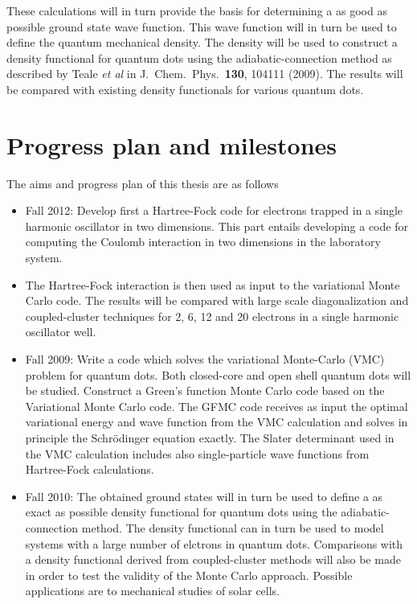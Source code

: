 These calculations will in turn provide the basis for determining a as good as possible
ground state wave function. This wave function will in turn be used to define the quantum
mechanical density.  The density will be used to construct a density functional for quantum dots
using the adiabatic-connection method as described by Teale {\em et al} in J.~Chem.~Phys.~{\bf 130},
104111 (2009).  The results will be compared with existing density functionals for various quantum dots.

\section*{Progress plan and milestones}
The aims and progress plan of this thesis are as follows
\begin{itemize}
\item Fall 2012: Develop first a Hartree-Fock code for electrons trapped in a single harmonic oscillator  
in two dimensions.   This part entails developing a code for computing the Coulomb interaction
in two dimensions in the laboratory system.
\item The Hartree-Fock interaction is then used as input to the variational Monte Carlo code.
The results will be compared with large scale diagonalization and coupled-cluster
techniques for 2, 6, 12 and 20 
electrons in a single harmonic oscillator well.
\item Fall 2009: Write a code which solves the variational Monte-Carlo (VMC) problem
      for quantum dots. Both closed-core and open shell quantum dots will be studied. 
Construct  a Green's function Monte Carlo code
      based on the Variational Monte Carlo code. 
      The GFMC code receives as input the optimal 
      variational energy and wave function from the VMC calculation and solves
      in principle the Schr\"odinger equation exactly.
      The Slater determinant used in the VMC calculation includes also
      single-particle wave functions from Hartree-Fock calculations.
 \item Fall 2010: The obtained ground states will in turn be used to define a as exact as possible 
density functional for quantum dots
using the adiabatic-connection method. The density functional can in turn be used to model
systems with a large number of elctrons in quantum dots. Comparisons with a density functional derived from coupled-cluster methods will also be made in order to
test the validity of the Monte Carlo approach.
Possible applications are to mechanical studies of solar cells.
\end{itemize}
 


